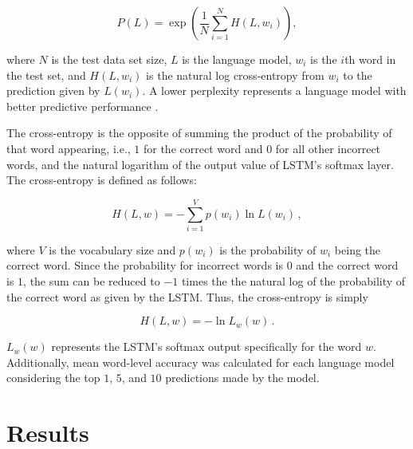 \documentclass[runningheads,a4paper]{llncs}
\begin{document}
\begin{equation}
\label{perplexity}
    P(L) = \exp\left(\frac{1}{N}\sum^{N}_{i=1} H(L,w_i)\right) ,
\end{equation}

where $N$ is the test data set size, $L$ is the language model, $w_i$
is the $i$th word in the test set, and $H(L, w_i)$ is the natural log
cross-entropy from $w_i$ to the prediction given by $L(w_i)$. A lower
perplexity represents a language model with better predictive
performance \cite{wang2016parallel}.

The cross-entropy is the opposite of summing the
product of the probability of that word appearing, i.e., $1$ for the
correct word and $0$ for all other incorrect words, and the
natural logarithm of the output value of LSTM's softmax layer.
The cross-entropy is defined as follows:

\begin{equation}
\label{cross-entropy}
    H(L,w) = - \sum_{i=1}^V p(w_i) \ln L(w_i) \, ,
\end{equation}

where $V$ is the vocabulary size and $p(w_i)$ is the probability of
$w_i$ being the correct word. Since the probability for incorrect
words is $0$ and the correct word is $1$, the sum can be reduced to
$-1$ times the the natural log of the probability of the correct word
as given by the LSTM.
Thus, the cross-entropy is simply

\begin{equation}
\label{simple-cross-entropy}
    H(L,w) = - \ln L_w(w) \, .
\end{equation}

$L_w(w)$ represents the LSTM's softmax output specifically for the
word $w$. Additionally, mean word-level accuracy was calculated for
each language model considering the top $1$, $5$, and $10$ predictions
made by the model.

\section{Results}
\end{document}
